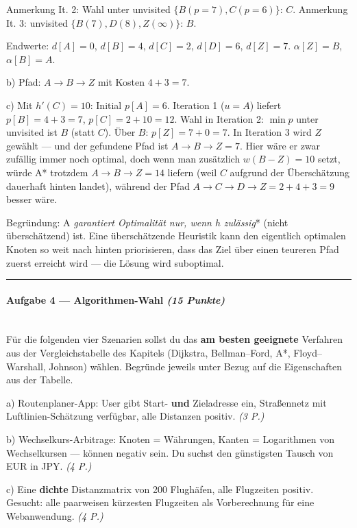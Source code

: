 \documentclass[11pt, a4paper]{article}
\begin{document}
Anmerkung It. 2: Wahl unter unvisited $\{B(p=7), C(p=6)\}$: $C$. Anmerkung It. 3: unvisited $\{B(7), D(8), Z(\infty)\}$: $B$.


Endwerte: $d[A]=0$, $d[B]=4$, $d[C]=2$, $d[D]=6$, $d[Z]=7$. $\alpha[Z]=B$, $\alpha[B]=A$.


b) Pfad: $A \to B \to Z$ mit Kosten $4+3=7$.


c) Mit $h'(C)=10$: Initial $p[A]=6$. Iteration 1 ($u=A$) liefert $p[B]=4+3=7$, $p[C]=2+10=12$. Wahl in Iteration 2: $\min p$ unter unvisited ist $B$ (statt $C$). Über $B$: $p[Z]=7+0=7$. In Iteration 3 wird $Z$ gewählt — und der gefundene Pfad ist $A\to B\to Z=7$. Hier wäre er zwar zufällig immer noch optimal, doch wenn man zusätzlich $w(B{-}Z)=10$ setzt, würde A* trotzdem $A\to B\to Z=14$ liefern (weil $C$ aufgrund der Überschätzung dauerhaft hinten landet), während der Pfad $A\to C\to D\to Z=2+4+3=9$ besser wäre.


Begründung: A\textit{ garantiert Optimalität nur, wenn $h$ }\textit{zulässig}* (nicht überschätzend) ist. Eine überschätzende Heuristik kann den eigentlich optimalen Knoten so weit nach hinten priorisieren, dass das Ziel über einen teureren Pfad zuerst erreicht wird — die Lösung wird suboptimal.



\noindent\textcolor{rulegray}{\rule{\linewidth}{0.4pt}}


\paragraph{Aufgabe 4 — Algorithmen-Wahl \textit{(15 Punkte)}}\mbox{}\\[2pt]

Für die folgenden vier Szenarien sollst du das \textbf{am besten geeignete} Verfahren aus der Vergleichstabelle des Kapitels (Dijkstra, Bellman–Ford, A*, Floyd–Warshall, Johnson) wählen. Begründe jeweils unter Bezug auf die Eigenschaften aus der Tabelle.


a) Routenplaner-App: User gibt Start- \textbf{und} Zieladresse ein, Straßennetz mit Luftlinien-Schätzung verfügbar, alle Distanzen positiv. \textit{(3 P.)}


b) Wechselkurs-Arbitrage: Knoten = Währungen, Kanten = Logarithmen von Wechselkursen — können negativ sein. Du suchst den günstigsten Tausch von EUR in JPY. \textit{(4 P.)}


c) Eine \textbf{dichte} Distanzmatrix von 200 Flughäfen, alle Flugzeiten positiv. Gesucht: alle paarweisen kürzesten Flugzeiten als Vorberechnung für eine Webanwendung. \textit{(4 P.)}
\end{document}
